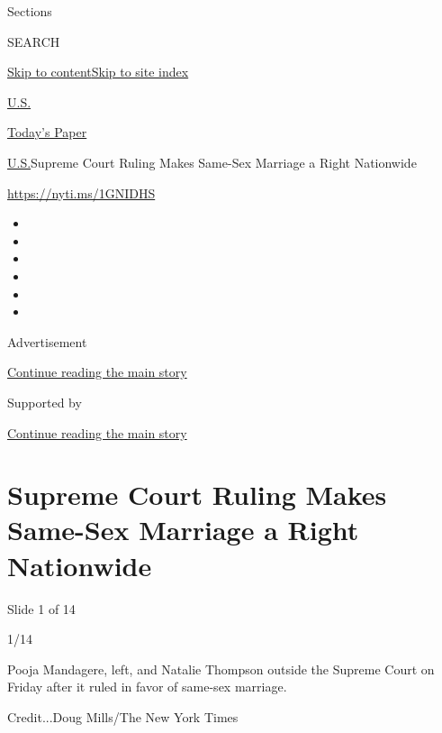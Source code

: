 Sections

SEARCH

\protect\hyperlink{site-content}{Skip to
content}\protect\hyperlink{site-index}{Skip to site index}

\href{https://www.nytimes3xbfgragh.onion/section/us}{U.S.}

\href{https://myaccount.nytimes3xbfgragh.onion/auth/login?response_type=cookie\&client_id=vi}{}

\href{https://www.nytimes3xbfgragh.onion/section/todayspaper}{Today's
Paper}

\href{/section/us}{U.S.}\textbar{}Supreme Court Ruling Makes Same-Sex
Marriage a Right Nationwide

\url{https://nyti.ms/1GNIDHS}

\begin{itemize}
\item
\item
\item
\item
\item
\item
\end{itemize}

Advertisement

\protect\hyperlink{after-top}{Continue reading the main story}

Supported by

\protect\hyperlink{after-sponsor}{Continue reading the main story}

\hypertarget{supreme-court-ruling-makes-same-sex-marriage-a-right-nationwide}{%
\section{Supreme Court Ruling Makes Same-Sex Marriage a Right
Nationwide}\label{supreme-court-ruling-makes-same-sex-marriage-a-right-nationwide}}

Slide 1 of 14

1/14

Pooja Mandagere, left, and Natalie Thompson outside the Supreme Court on
Friday after it ruled in favor of same-sex marriage.

Credit...Doug Mills/The New York Times

